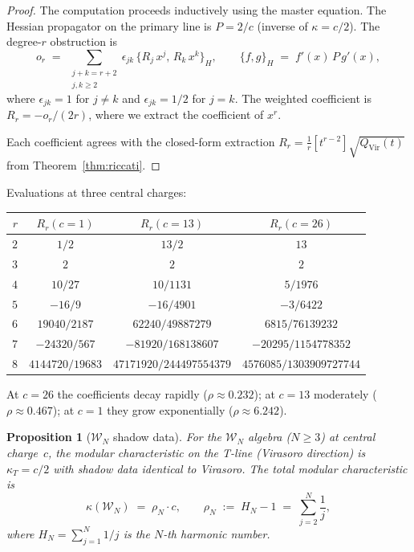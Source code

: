 \documentclass[11pt]{article}
\theoremstyle{plain}
\newtheorem{proposition}[theorem]{Proposition}
\theoremstyle{definition}
\theoremstyle{remark}
\newcommand{\cW}{\mathcal{W}}
\begin{document}
\begin{proof}
The computation proceeds inductively using the master
equation. The Hessian propagator on the primary line
is $P = 2/c$ (inverse of $\kappa = c/2$).
The degree-$r$ obstruction is
\[
 o_r
 \;=\; \sum_{\substack{j + k = r + 2 \\ j, k \geq 2}}
 \epsilon_{jk}\,\{R_j\,x^j,\, R_k\,x^k\}_H,
 \qquad
 \{f,g\}_H \;=\; f'(x)\,P\,g'(x),
\]
where $\epsilon_{jk} = 1$ for $j \neq k$ and
$\epsilon_{jk} = 1/2$ for $j = k$.
The weighted coefficient is $R_r = -o_r/(2r)$, where we
extract the coefficient of $x^r$.

Each coefficient agrees with the closed-form extraction
$R_r = \frac{1}{r}[t^{r-2}]\sqrt{Q_{\mathrm{Vir}}(t)}$
from Theorem~\ref{thm:riccati}.
\end{proof}

Evaluations at three central charges:

\begin{center}
\renewcommand{\arraystretch}{1.2}
\begin{tabular}{rccc}
\toprule
$r$ & $R_r(c{=}1)$ & $R_r(c{=}13)$ & $R_r(c{=}26)$ \\
\midrule
$2$ & $1/2$ & $13/2$ & $13$ \\
$3$ & $2$ & $2$ & $2$ \\
$4$ & $10/27$ & $10/1131$ & $5/1976$ \\
$5$ & $-16/9$ & $-16/4901$ & $-3/6422$ \\
$6$ & $19040/2187$ & $62240/49887279$ & $6815/76139232$ \\
$7$ & $-24320/567$ & $-81920/168138607$ & $-20295/1154778352$ \\
$8$ & $4144720/19683$ & $47171920/244497554379$
 & $4576085/1303909727744$ \\
\bottomrule
\end{tabular}
\end{center}

\noindent At $c = 26$ the coefficients decay rapidly
($\rho \approx 0.232$); at $c = 13$ moderately
($\rho \approx 0.467$); at $c = 1$ they grow
exponentially ($\rho \approx 6.242$).


\begin{proposition}[$\cW_N$ shadow data]
\label{prop:wN-shadow}
For the $\cW_N$ algebra ($N \geq 3$) at central charge~$c$,
the modular characteristic on the T-line (Virasoro direction)
is $\kappa_T = c/2$ with shadow data identical to
Virasoro. The total modular characteristic is
\[
 \kappa(\cW_N)
 \;=\; \rho_N \cdot c,
 \qquad
 \rho_N \;:=\; H_N - 1
 \;=\; \sum_{j=2}^{N} \frac{1}{j},
\]
where $H_N = \sum_{j=1}^{N} 1/j$ is the $N$-th harmonic
number.
\end{proposition}
\end{document}
